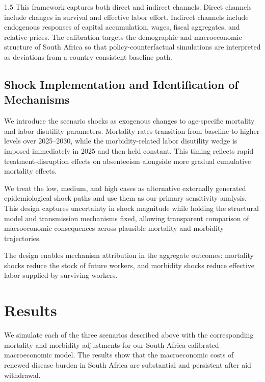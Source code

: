 \documentclass[letterpaper,12pt]{article}
\theoremstyle{definition}
\begin{document}
\begin{spacing}{1.5}
This framework captures both direct and indirect channels. Direct channels include changes in survival and effective labor effort. Indirect channels include endogenous responses of capital accumulation, wages, fiscal aggregates, and relative prices. The calibration targets the demographic and macroeconomic structure of South Africa so that policy-counterfactual simulations are interpreted as deviations from a country-consistent baseline path.


\subsection{Shock Implementation and Identification of Mechanisms}\label{SecShocks}

We introduce the scenario shocks as exogenous changes to age-specific mortality and labor disutility parameters. Mortality rates transition from baseline to higher levels over 2025--2030, while the morbidity-related labor disutility wedge is imposed immediately in 2025 and then held constant. This timing reflects rapid treatment-disruption effects on absenteeism alongside more gradual cumulative mortality effects.

We treat the low, medium, and high cases as alternative externally generated epidemiological shock paths and use them as our primary sensitivity analysis. This design captures uncertainty in shock magnitude while holding the structural model and transmission mechanisms fixed, allowing transparent comparison of macroeconomic consequences across plausible mortality and morbidity trajectories.

The design enables mechanism attribution in the aggregate outcomes: mortality shocks reduce the stock of future workers, and morbidity shocks reduce effective labor supplied by surviving workers.


\section{Results}\label{SecResults}

We simulate each of the three scenarios described above with the corresponding mortality and morbidity adjustments for our South Africa calibrated macroeconomic model. The results show that the macroeconomic costs of renewed disease burden in South Africa are substantial and persistent after aid withdrawal.


\end{spacing}
\end{document}
